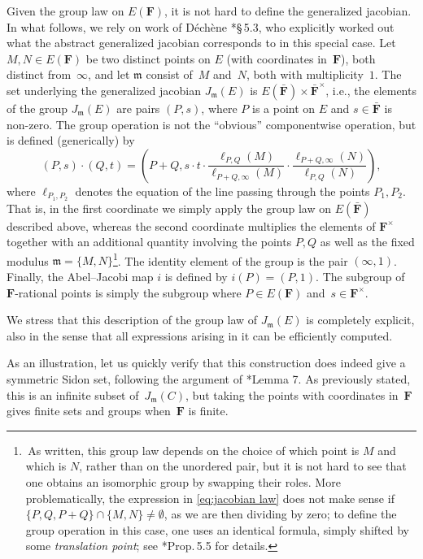 \documentclass[12pt]{amsart}
\numberwithin{equation}{section}
\newcommand{\Ff}{\mathbf{F}}
\newcommand{\mfm}{\mathfrak{m}}
\theoremstyle{plain}
\theoremstyle{remark}
\theoremstyle{definition}
\begin{document}
Given the group law on $E(\Ff)$, it is not hard to define the
generalized jacobian. In what follows, we rely on work of Déchène
\cite{dechene}*{\S\,5.3}, who explicitly worked out what the abstract
generalized jacobian corresponds to in this special case. Let
$M,N \in E(\Ff)$ be two distinct points on $E$ (with coordinates
in~$\Ff$), both distinct from~$\infty$, and let $\mfm$ consist of~$M$
and~$N$, both with multiplicity~$1$. The set underlying the
generalized jacobian $J_\mfm(E)$ is
$E(\bar{\Ff})\times \bar{\Ff}^\times$, i.e., the elements of the group
$J_\mfm(E)$ are pairs $(P,s)$, where $P$ is a point on $E$ and
$s \in \bar{\Ff}$ is non-zero. The group operation is not the ``obvious''
componentwise operation, but is defined (generically) by
\begin{equation}\label{eq:jacobian law}
  (P,s) \cdot (Q,t) = \left( P+Q, s\cdot t \cdot
    \frac{\ell_{P,Q}(M)}{\ell_{P+Q,\infty}(M)}\cdot
    \frac{\ell_{P+Q,\infty}(N)}{\ell_{P,Q}(N)} \right),
\end{equation}
where $\ell_{P_1,P_2}$ denotes the equation of the line passing
through the points $P_1,P_2$. That is, in the first coordinate we
simply apply the group law on $E(\bar{\Ff})$ described above, whereas
the second coordinate multiplies the elements of $\Ff^\times$ together
with an additional quantity involving the points $P,Q$ as
well as the fixed modulus $\mfm=\{M,N\}$\footnote{\,As written, this
  group law depends on the choice of which point is $M$ and which is
  $N$, rather than on the unordered pair, but it is not hard to see
  that one obtains an isomorphic group by swapping their roles. More
  problematically, the expression in \eqref{eq:jacobian law} does not
  make sense if $\{P,Q,P+Q\} \cap \{M,N\} \neq \emptyset$, as we are
  then dividing by zero; to define the group operation in this case,
  one uses an identical formula, simply shifted by some
  \emph{translation point}; see \cite{dechene}*{Prop.\,5.5} for
  details.}. The identity element of the group is the pair
$(\infty,1)$.  Finally, the Abel--Jacobi map
$i$ is defined  by $i(P) = (P,1)$. The
subgroup of $\Ff$-rational points is simply the subgroup where
$P\in E(\Ff)$ and~$s\in\Ff^{\times}$.

We stress that this description of the group law of $J_\mfm(E)$ is
completely explicit, also in the sense that all expressions arising in it can be
efficiently computed.

As an illustration,  let us quickly verify that this construction does
indeed give a symmetric Sidon set, following the argument of
\cite{ffk2}*{Lemma 7}. As previously stated, this is an infinite
subset of~$J_{\mfm}(C)$, but taking the points with coordinates
in~$\Ff$ gives finite sets and groups when~$\Ff$ is finite.
\end{document}
